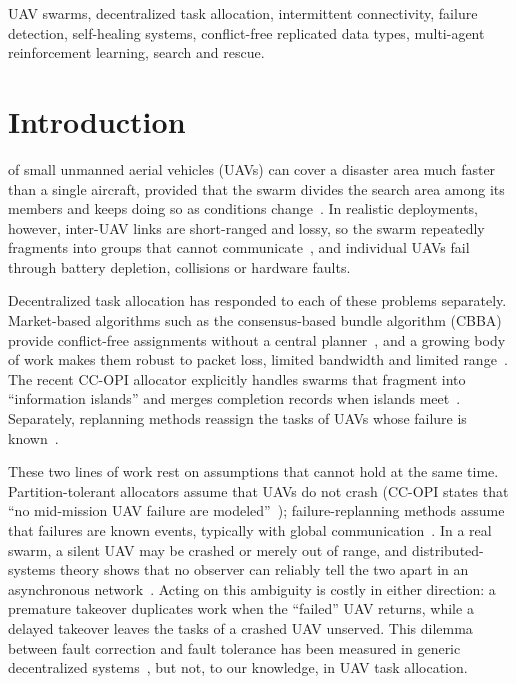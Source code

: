 \documentclass[journal]{IEEEtran}
\begin{document}
\begin{IEEEkeywords}
UAV swarms, decentralized task allocation, intermittent connectivity, failure detection, self-healing systems, conflict-free replicated data types, multi-agent reinforcement learning, search and rescue.
\end{IEEEkeywords}

\section{Introduction}
 of small unmanned aerial vehicles (UAVs) can cover a disaster area much faster than a single aircraft, provided that the swarm divides the search area among its members and keeps doing so as conditions change~\cite{R04_chung2018}. In realistic deployments, however, inter-UAV links are short-ranged and lossy, so the swarm repeatedly fragments into groups that cannot communicate~\cite{R21_tegicho2023,R16_oubbati2019}, and individual UAVs fail through battery depletion, collisions or hardware faults.

Decentralized task allocation has responded to each of these problems separately. Market-based algorithms such as the consensus-based bundle algorithm (CBBA) provide conflict-free assignments without a central planner~\cite{R02_choi2009,R03_johnson2011}, and a growing body of work makes them robust to packet loss, limited bandwidth and limited range~\cite{R22_raja2022,R24_tong2026,R25_qian2026,R27_verma2025}. The recent CC-OPI allocator explicitly handles swarms that fragment into ``information islands'' and merges completion records when islands meet~\cite{R66_liu2026}. Separately, replanning methods reassign the tasks of UAVs whose failure is known~\cite{R35_bai2026,R67_giacomossi2026}.

These two lines of work rest on assumptions that cannot hold at the same time. Partition-tolerant allocators assume that UAVs do not crash (CC-OPI states that ``no mid-mission UAV failure are modeled''~\cite{R66_liu2026}); failure-replanning methods assume that failures are known events, typically with global communication~\cite{R67_giacomossi2026}. In a real swarm, a silent UAV may be crashed or merely out of range, and distributed-systems theory shows that no observer can reliably tell the two apart in an asynchronous network~\cite{R05_fischer1985,R06_chandra1996}. Acting on this ambiguity is costly in either direction: a premature takeover duplicates work when the ``failed'' UAV returns, while a delayed takeover leaves the tasks of a crashed UAV unserved. This dilemma between fault correction and fault tolerance has been measured in generic decentralized systems~\cite{R43_nikolic2021}, but not, to our knowledge, in UAV task allocation.
\end{document}
